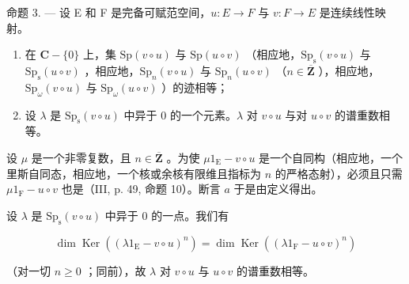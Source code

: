 命题 3. --- 设 E 和 F 是完备可赋范空间，\(u\colon E\to F\) 与 \(v\colon F\to E\) 是连续线性映射。

\begin{enumerate}
\def\labelenumi{\alph{enumi})}
\item
  在 \(\mathbf{C} - \{0\}\) 上，集 \(\mathrm{Sp}(v \circ u)\) 与 \(\mathrm{Sp}(u \circ v)\) （相应地，\(\mathrm{Sp}_{\mathrm{s}}(v \circ u)\) 与 \(\mathrm{Sp}_{\mathrm{s}}(u \circ v)\) ，相应地，\(\mathrm{Sp}_{n}(v \circ u)\) 与 \(\mathrm{Sp}_{n}(u \circ v)\) （\(n \in \overline{\mathbf{Z}}\) ），相应地，\(\mathrm{Sp}_{\omega}(v \circ u)\) 与 \(\mathrm{Sp}_{\omega}(u \circ v)\) ）的迹相等；
\item
  设 \(\lambda\) 是 \(\mathrm{Sp}_{\mathrm{s}}(v \circ u)\) 中异于 0 的一个元素。\(\lambda\) 对 \(v \circ u\) 与对 \(u \circ v\) 的谱重数相等。
\end{enumerate}

设 \(\mu\) 是一个非零复数，且 \(n \in \overline{\mathbf{Z}}\) 。为使 \(\mu 1_{\mathrm{E}} - v \circ u\) 是一个自同构（相应地，一个里斯自同态，相应地，一个核或余核有限维且指标为 \(n\) 的严格态射），必须且只需 \(\mu 1_{\mathrm{F}} - u \circ v\) 也是（III, p. 49, 命题 10）。断言 \(a\) 于是由定义得出。

设 \(\lambda\) 是 \(\mathrm{Sp}_{\mathrm{s}}(v \circ u)\) 中异于 0 的一点。我们有

\[
\dim \operatorname{Ker} ((\lambda 1 _ {\mathrm{E}} - v \circ u) ^ {n}) = \dim \operatorname{Ker} ((\lambda 1 _ {\mathrm{F}} - u \circ v) ^ {n})
\]

（对一切 \(n \geqslant 0\) ；同前），故 \(\lambda\) 对 \(v \circ u\) 与 \(u \circ v\) 的谱重数相等。

